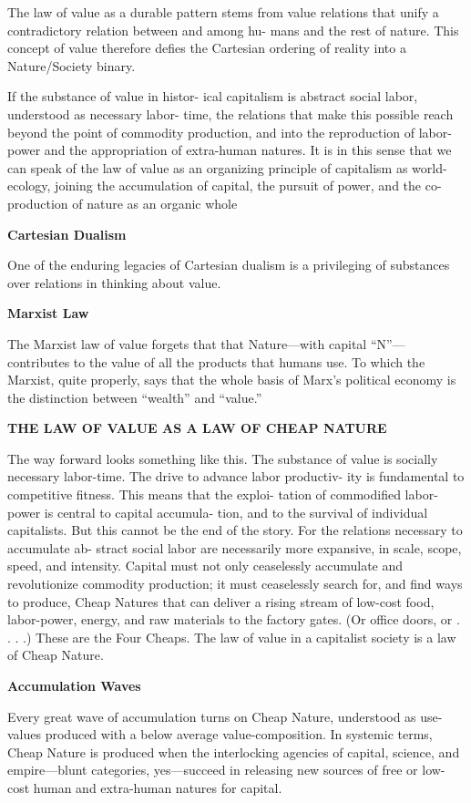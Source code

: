 \documentclass[
]{book}
\begin{document}
The law of value as a durable pattern stems from value
relations that unify a contradictory relation between and among hu-
mans and the rest of nature. This concept of value therefore defies
the Cartesian ordering of reality into a Nature/Society binary.

If the substance of value in histor-
ical capitalism is abstract social labor, understood as necessary labor-
time, the relations that make this possible reach beyond the point of
commodity production, and into the reproduction of labor-power
and the appropriation of extra-human natures.
It is in this sense that
we can speak of the law of value as an organizing principle of capitalism
as world-ecology, joining the accumulation of capital, the pursuit
of power, and the co-production of nature as an organic whole

\textbf{Cartesian Dualism}

One of the enduring legacies of Cartesian dualism is a
privileging of substances over relations in thinking about value.

\textbf{Marxist Law}

The Marxist law of value forgets that that Nature---with capital ``N''---contributes to the
value of all the products that humans use. To which the Marxist, quite
properly, says that the whole basis of Marx's political economy is the
distinction between ``wealth'' and ``value.''

\textbf{THE LAW OF VALUE AS A LAW OF CHEAP NATURE}

The way forward looks something like this. The substance of value
is socially necessary labor-time. The drive to advance labor productiv-
ity is fundamental to competitive fitness. This means that the exploi-
tation of commodified labor-power is central to capital accumula-
tion, and to the survival of individual capitalists. But this cannot be
the end of the story. For the relations necessary to accumulate ab-
stract social labor are necessarily more expansive, in scale, scope,
speed, and intensity. Capital must not only ceaselessly accumulate
and revolutionize commodity production; it must ceaselessly search
for, and find ways to produce, Cheap Natures that can deliver a rising
stream of low-cost food, labor-power, energy, and raw materials to the
factory gates. (Or office doors, or . . . .) These are the Four Cheaps.
The law of value in a capitalist society is a law of Cheap Nature.

\textbf{Accumulation Waves}

Every great wave of accumulation turns on Cheap Nature, understood as use-values produced with
a below average value-composition. In systemic terms, Cheap Nature
is produced when the interlocking agencies of capital, science, and
empire---blunt categories, yes---succeed in releasing new sources of
free or low-cost human and extra-human natures for capital.
\end{document}
